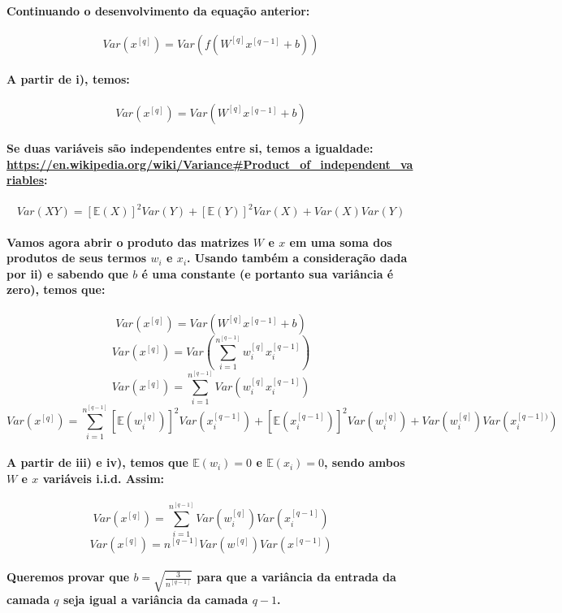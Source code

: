 \documentclass[a4paper]{article}    %
\begin{document}
\paragraph{Continuando o desenvolvimento da equação anterior:}
\[Var(x^{[q]}) = Var(f(W^{[q]} x^{[q-1]} + b))\]

\paragraph{A partir de i), temos:}
\[Var(x^{[q]}) = Var(W^{[q]} x^{[q-1]} + b)\]

\paragraph{Se duas variáveis são independentes entre si, temos a igualdade:\\
\href{https://en.wikipedia.org/wiki/Variance\#Product_of_independent_variables}{https://en.wikipedia.org/wiki/Variance\#Product\_of\_independent\_variables}:}
\[Var(XY) = [\mathbb{E}(X)]^2 Var(Y) + [\mathbb{E}(Y)]^2 Var(X) + Var(X)Var(Y)\]

\paragraph{Vamos agora abrir o produto das matrizes $W$ e $x$ em uma soma dos produtos de seus termos  $w_i$ e $x_i$. Usando também a consideração dada por ii) e sabendo que $b$ é uma constante (e portanto sua variância é zero), temos que:}
\[Var(x^{[q]}) = Var(W^{[q]} x^{[q-1]} + b)\]
\[Var(x^{[q]}) = Var(\sum_{i=1}^{n^{[q-1]}} w_i^{[q]} x_i^{[q-1]})\]
\[Var(x^{[q]}) = \sum_{i=1}^{n^{[q-1]}} Var(w_i^{[q]} x_i^{[q-1]})\]
\[Var(x^{[q]}) = \sum_{i=1}^{n^{[q-1]}}[\mathbb{E}(w_i^{[q]})]^2 Var(x_i^{[q-1]}) + [\mathbb{E}(x_i^{[q-1]})]^2 Var(w_i^{[q]}) + Var(w_i^{[q]})Var(x_i^{[q-1])})\]

\paragraph{A partir de iii) e iv), temos que $\mathbb{E}(w_i) = 0$ e $\mathbb{E}(x_i) = 0$, sendo ambos $W$ e $x$ variáveis i.i.d. Assim:}
\[Var(x^{[q]}) = \sum_{i=1}^{n^{[q-1]}} Var(w_i^{[q]})Var(x_i^{[q-1]})\]
\[\boxed{Var(x^{[q]}) = n^{[q-1]} Var(w^{[q]})Var(x^{[q-1]})}\]

\paragraph{Queremos provar que $b = \sqrt{\frac{3}{n^{[q-1]}}}$ para que a variância da entrada da camada $q$ seja igual a variância da camada $q-1$.}
\end{document}
